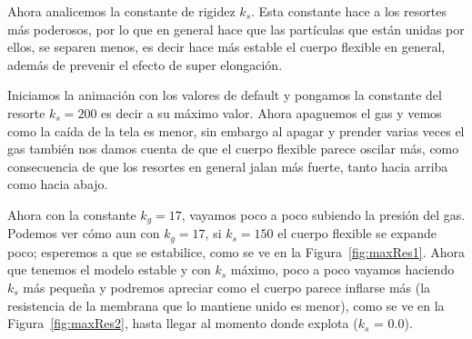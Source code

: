 Ahora analicemos la constante de rigidez $k_s$.
Esta constante hace a los resortes más poderosos, por lo que en general hace que las partículas que están unidas por ellos, se separen menos, es decir hace más estable el cuerpo flexible en general, además de prevenir el efecto de super elongación.

Iniciamos la animación con los valores de default y pongamos la constante del resorte $k_s=200$ es decir a su máximo valor.
Ahora apaguemos el gas y vemos como la caída de la tela es menor, sin embargo al apagar y prender varias veces el gas también nos damos cuenta de que el cuerpo flexible parece oscilar más, como consecuencia de que los resortes en general jalan más fuerte, tanto hacia arriba como hacia abajo.

Ahora con la constante $k_g=17$, vayamos poco a poco subiendo la presión del gas. 
Podemos ver cómo aun con $k_g=17$, si $k_s=150$ el cuerpo flexible se expande poco; esperemos a que se estabilice, como se ve en la Figura~\ref{fig:maxRes1}. 
Ahora que tenemos el modelo estable y con $k_s$ máximo, poco a poco vayamos haciendo $k_s$ más pequeña y podremos apreciar como el cuerpo parece inflarse más (la resistencia de la membrana que lo mantiene unido es menor), como se ve en la Figura~\ref{fig:maxRes2}, hasta llegar al momento donde explota ($k_s$ = 0.0).

